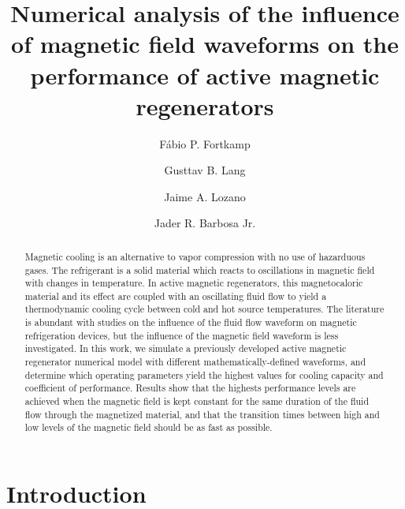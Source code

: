 \documentclass[referee]{svjour3}
\begin{document}
\title{Numerical analysis of the influence of magnetic field waveforms on the performance of active magnetic regenerators}

\author{
Fábio P. Fortkamp \and
Gusttav B. Lang \and
Jaime A. Lozano \and
Jader R. Barbosa Jr.
}




\date{}

\maketitle

\begin{abstract}
Magnetic cooling is an alternative to vapor compression with no use of hazarduous gases. The refrigerant is a solid material which reacts to oscillations in magnetic field with changes in temperature. In active magnetic regenerators, this magnetocaloric material and its effect are coupled with an oscillating fluid flow to yield a thermodynamic cooling cycle between cold and hot source temperatures. The literature is abundant with studies on the influence of the fluid flow waveform on magnetic refrigeration devices, but the influence of the magnetic field waveform is less investigated. In this work, we simulate a previously developed active magnetic regenerator numerical model with different mathematically-defined waveforms, and determine which operating parameters yield the highest values for cooling capacity and coefficient of performance. Results show that the highests performance levels are achieved when the magnetic field is kept constant for the same duration of the fluid flow through the magnetized material, and that the transition times between high and low levels of the magnetic field should be as fast as possible.

\end{abstract}

\printnomenclature

\section{Introduction}
\label{sec:introduction}
\end{document}

